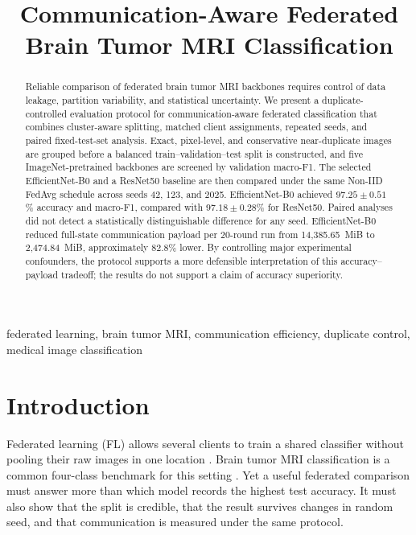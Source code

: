 \documentclass[conference]{IEEEtran}
\title{Communication-Aware Federated Brain Tumor MRI Classification}
\author{\IEEEauthorblockN{Anonymous Authors}}
\begin{document}
\maketitle

\begin{abstract}
Reliable comparison of federated brain tumor MRI backbones requires control of data leakage, partition variability, and statistical uncertainty. We present a duplicate-controlled evaluation protocol for communication-aware federated classification that combines cluster-aware splitting, matched client assignments, repeated seeds, and paired fixed-test-set analysis. Exact, pixel-level, and conservative near-duplicate images are grouped before a balanced train--validation--test split is constructed, and five ImageNet-pretrained backbones are screened by validation macro-F1. The selected EfficientNet-B0 and a ResNet50 baseline are then compared under the same Non-IID FedAvg schedule across seeds 42, 123, and 2025. EfficientNet-B0 achieved $97.25\pm0.51$\% accuracy and macro-F1, compared with $97.18\pm0.28$\% for ResNet50. Paired analyses did not detect a statistically distinguishable difference for any seed. EfficientNet-B0 reduced full-state communication payload per 20-round run from 14,385.65~MiB to 2,474.84~MiB, approximately 82.8\% lower. By controlling major experimental confounders, the protocol supports a more defensible interpretation of this accuracy--payload tradeoff; the results do not support a claim of accuracy superiority.
\end{abstract}

\begin{IEEEkeywords}
federated learning, brain tumor MRI, communication efficiency, duplicate control, medical image classification
\end{IEEEkeywords}

\section{Introduction}
Federated learning (FL) allows several clients to train a shared classifier without pooling their raw images in one location \cite{mcmahan2017fedavg,rieke2020future}. Brain tumor MRI classification is a common four-class benchmark for this setting \cite{nickparvar_brain_tumor_mri,bentemessek2025brain,khatoon2026resnet50,ghanta2025federated}. Yet a useful federated comparison must answer more than which model records the highest test accuracy. It must also show that the split is credible, that the result survives changes in random seed, and that communication is measured under the same protocol.
\end{document}
